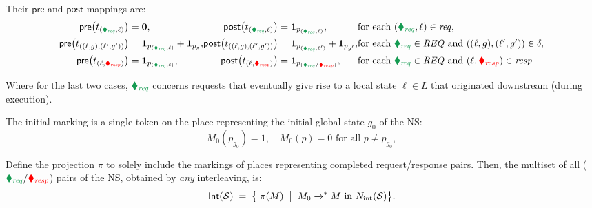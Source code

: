 Their \(\mathsf{pre}\) and \(\mathsf{post}\) mappings are:
\[
\begin{alignedat}{3}
	\mathsf{pre}\bigl(t_{({\color{ForestGreen}\blacklozenge_{\mathit{req}}},\ell)}\bigr)
	&= \mathbf0, &
	\mathsf{post}\bigl(t_{({\color{ForestGreen}\blacklozenge_{\mathit{req}}},\ell)}\bigr)
	&= \mathbf1_{p_{({\color{ForestGreen}\blacklozenge_{\mathit{req}}},\ell)}}, 
	&&\text{for each }({\color{ForestGreen}\blacklozenge_{\mathit{req}}},\ell)\in\mathit{req},\\
\mathsf{pre}\bigl(t_{((\ell,g),(\ell',g'))}\bigr)
&= \mathbf1_{p_{({\color{ForestGreen}\blacklozenge_{\mathit{req}}},\ell)}} + \mathbf1_{p_g}, &
\mathsf{post}\bigl(t_{((\ell,g),(\ell',g'))}\bigr)
&= \mathbf1_{p_{({\color{ForestGreen}\blacklozenge_{\mathit{req}}},\ell')}} + \mathbf1_{p_{g'}}, 
&&\text{for each }{\color{ForestGreen}\blacklozenge_{\mathit{req}}}\in\mathit{REQ}\text{ and }((\ell,g),(\ell',g'))\in\delta,\\
	\mathsf{pre}\bigl(t_{(\ell,{\color{red}\blacklozenge_{\mathit{resp}}})}\bigr)
	&= \mathbf1_{p_{({\color{ForestGreen}\blacklozenge_{\mathit{req}}},\ell)}}, &
\mathsf{post}\bigl(t_{(\ell,{\color{red}\blacklozenge_{\mathit{resp}}})}\bigr)
&= \mathbf1_{p_{({\color{ForestGreen}\blacklozenge_{\mathit{req}}}/{\color{red}\blacklozenge_{\mathit{resp}}})}}, 
&&\text{for each }{\color{ForestGreen}\blacklozenge_{\mathit{req}}}\in\mathit{REQ}\text{ and }(\ell,{\color{red}\blacklozenge_{\mathit{resp}}})\in\mathit{resp}
\end{alignedat}
\]

Where for the last two cases, \({\color{ForestGreen}\blacklozenge_{\mathit{req}}}\) concerns requests that eventually give rise to a local state \(\ell \in L\) that originated downstream (during execution).

\medskip
The initial marking is a single token on the place representing the initial global state $g_0$ of the NS:
\[
M_0(p_{g_0}) = 1,
\quad
M_0(p) = 0 \text{ for all }p\neq p_{g_0},
\]



Define the projection \(\pi\) to solely include the markings of places representing completed request/response pairs.
Then, the multiset of all  (${{\color{ForestGreen}\blacklozenge_{\mathit{req}}}/{\color{red}\blacklozenge_{\mathit{resp}}}}$) pairs of the NS, obtained by \textit{any} interleaving, is:
\[
\mathsf{Int}(\mathcal S)
\;=\;
\bigl\{\;\pi(M)\;\bigm|\;M_0 \xrightarrow{}^{*} M\text{ in }N_{\mathrm{int}}(\mathcal S)\bigr\}.
\]
